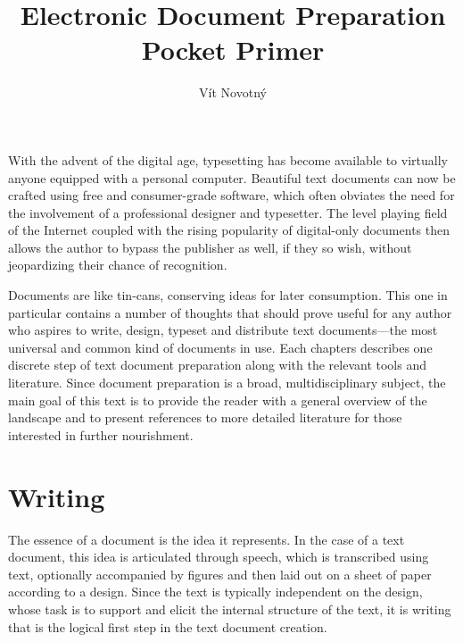 \documentclass{book}
\begin{document}
\frontmatter
\title{Electronic Document Preparation\\Pocket Primer}
\author{Vít Novotný}
\maketitle
\tableofcontents
\mainmatter

With the advent of the digital age, typesetting has become available to
virtually anyone equipped with a personal computer. Beautiful text documents can
now be crafted using free and consumer-grade software, which often obviates the
need for the involvement of a professional designer and typesetter. The level
playing field of the Internet coupled with the rising popularity of digital-only
documents then allows the author to bypass the publisher as well, if they so
wish, without jeopardizing their chance of recognition.

Documents are like tin-cans, conserving ideas for later consumption. This one in
particular contains a number of thoughts that should prove useful for any author
who aspires to write, design, typeset and distribute text documents---the most
universal and common kind of documents in use. Each chapters describes one
discrete step of text document preparation along with the relevant tools and
literature. Since document preparation is a broad, multidisciplinary subject,
the main goal of this text is to provide the reader with a general overview of
the landscape and to present references to more detailed literature for those
interested in further nourishment.

\chapter{Writing}
The essence of a document is the idea it represents. In the case of a text
document, this idea is articulated through speech, which is transcribed using
text, optionally accompanied by figures and then laid out on a sheet of paper
according to a design. Since the text is typically independent on the design,
whose task is to support and elicit the internal structure of the text, it is
writing that is the logical first step in the text document creation.

\end{document}
